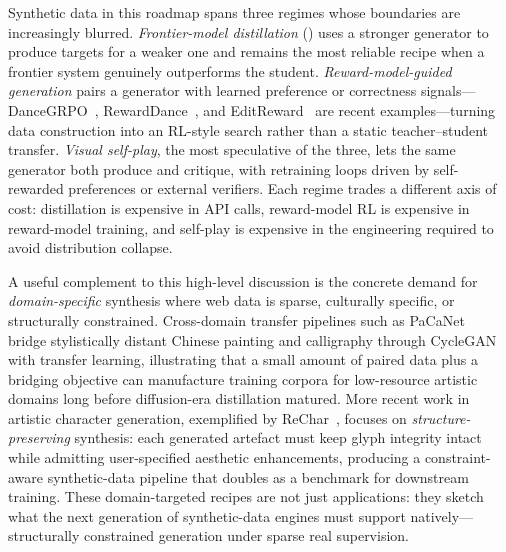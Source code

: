 Synthetic data in this roadmap spans three regimes whose boundaries are increasingly blurred. \emph{Frontier-model distillation} () uses a stronger generator to produce targets for a weaker one and remains the most reliable recipe when a frontier system genuinely outperforms the student. \emph{Reward-model-guided generation} pairs a generator with learned preference or correctness signals---DanceGRPO~\citep{xue2025dancegrpo}, RewardDance~\citep{wu2025rewarddance}, and EditReward~\citep{wu2025editreward} are recent examples---turning data construction into an RL-style search rather than a static teacher--student transfer. \emph{Visual self-play}, the most speculative of the three, lets the same generator both produce and critique, with retraining loops driven by self-rewarded preferences or external verifiers. Each regime trades a different axis of cost: distillation is expensive in API calls, reward-model RL is expensive in reward-model training, and self-play is expensive in the engineering required to avoid distribution collapse.

A useful complement to this high-level discussion is the concrete demand for \emph{domain-specific} synthesis where web data is sparse, culturally specific, or structurally constrained. Cross-domain transfer pipelines such as PaCaNet~\citep{PaCaNet} bridge stylistically distant Chinese painting and calligraphy through CycleGAN with transfer learning, illustrating that a small amount of paired data plus a bridging objective can manufacture training corpora for low-resource artistic domains long before diffusion-era distillation matured. More recent work in artistic character generation, exemplified by ReChar~\citep{Rechar}, focuses on \emph{structure-preserving} synthesis: each generated artefact must keep glyph integrity intact while admitting user-specified aesthetic enhancements, producing a constraint-aware synthetic-data pipeline that doubles as a benchmark for downstream training. These domain-targeted recipes are not just applications: they sketch what the next generation of synthetic-data engines must support natively---structurally constrained generation under sparse real supervision.

